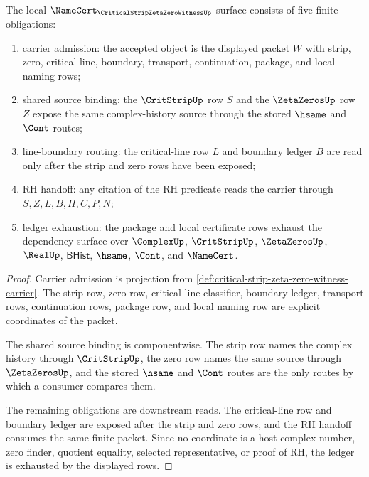 \begin{theorem}
\label{thm:critical-strip-zeta-zero-witness-namecert-obligations}
The local $\NameCert_{\CriticalStripZetaZeroWitnessUp}$ surface consists of five finite obligations:
\begin{enumerate}
\item carrier admission: the accepted object is the displayed packet $W$ with strip, zero, critical-line, boundary, transport, continuation, package, and local naming rows;
\item shared source binding: the $\CritStripUp$ row $S$ and the $\ZetaZerosUp$ row $Z$ expose the same complex-history source through the stored $\hsame$ and $\Cont$ routes;
\item line-boundary routing: the critical-line row $L$ and boundary ledger $B$ are read only after the strip and zero rows have been exposed;
\item RH handoff: any citation of the RH predicate reads the carrier through $S,Z,L,B,H,C,P,N$;
\item ledger exhaustion: the package and local certificate rows exhaust the dependency surface over $\ComplexUp$, $\CritStripUp$, $\ZetaZerosUp$, $\RealUp$, $\mathsf{BHist}$, $\hsame$, $\Cont$, and $\NameCert$.
\end{enumerate}
\end{theorem}
\begin{proof}
Carrier admission is projection from \autoref{def:critical-strip-zeta-zero-witness-carrier}. The strip row, zero row, critical-line classifier, boundary ledger, transport rows, continuation rows, package row, and local naming row are explicit coordinates of the packet.

The shared source binding is componentwise. The strip row names the complex history through $\CritStripUp$, the zero row names the same source through $\ZetaZerosUp$, and the stored $\hsame$ and $\Cont$ routes are the only routes by which a consumer compares them.

The remaining obligations are downstream reads. The critical-line row and boundary ledger are exposed after the strip and zero rows, and the RH handoff consumes the same finite packet. Since no coordinate is a host complex number, zero finder, quotient equality, selected representative, or proof of RH, the ledger is exhausted by the displayed rows.
\end{proof}

